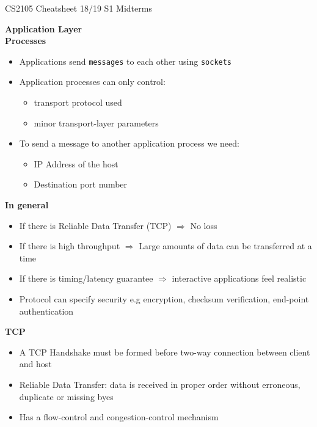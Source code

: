 \documentclass[a4paper]{article} \usepackage[backend=biber, style=numeric, sorting=none]{biblatex}
\begin{document}
\setlength\parindent{0pt} %
\scriptsize
{}

\begin{center}
{\large CS2105 Cheatsheet 18/19 S1 Midterms}\\
\end{center}
    \begin{multicols*}{4}

{\small\textbf{Application Layer}} \\
\textbf{Processes}
\begin{itemize}[leftmargin=*]
\itemsep -0.5em
\item Applications send \texttt{messages} to each other using \texttt{sockets}
\item Application processes can only control:
  \begin{itemize}[leftmargin=*]
  \item transport protocol used
  \item minor transport-layer parameters
  \end{itemize}
\item To send a message to another application process we need:
  \begin{itemize}[leftmargin=*]
  \item IP Address of the host
  \item Destination port number
  \end{itemize}
\end{itemize}

\textbf{In general}
\begin{itemize}[leftmargin=*]
\item If there is Reliable Data Transfer (TCP) $\Rightarrow$ No loss
\item If there is high throughput $\Rightarrow$ Large amounts of data can be transferred at a time
\item If there is timing/latency guarantee $\Rightarrow$ interactive applications feel realistic
\item Protocol can specify security e.g encryption, checksum verification, end-point authentication
\end{itemize}

\textbf{TCP}
\begin{itemize}[leftmargin=*]
\item A TCP Handshake must be formed before two-way connection between client and host
\item Reliable Data Transfer: data is received in proper order without erroneous, duplicate or missing byes
\item Has a flow-control and congestion-control mechanism
\end{itemize}


\end{multicols*}
\end{document}
